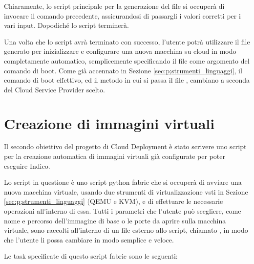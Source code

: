             Chiaramente, lo script principale per la generazione del file  si occuperà di invocare il comando precedente, assicurandosi di passargli i valori corretti per i vari input. Dopodiché lo script terminerà.
            
            Una volta che lo script avrà terminato con successo, l'utente potrà utilizzare il file  generato per inizializzare e configurare una nuova macchina su cloud in modo completamente automatico, semplicemente specificando il file  come argomento del comando di boot. Come già accennato in Sezione \ref{sec:p;strumenti_linguaggi}, il comando di boot effettivo, ed il metodo in cui si passa il file , cambiano a seconda del Cloud Service Provider scelto.

    \section{Creazione di immagini virtuali} \label{sec:cd;creazione_immagini_virtuali}
    
        Il secondo obiettivo del progetto di Cloud Deployment è stato scrivere uno script per la creazione automatica di immagini virtuali già configurate per poter eseguire Indico.
        
        Lo script in questione è uno script python fabric che si occuperà di avviare una nuova macchina virtuale, usando due strumenti di virtualizzazione vsti in Sezione \ref{sec:p;strumenti_linguaggi} (\ac{QEMU} e \ac{KVM}), e di effettuare le necessarie operazioni all'interno di essa. Tutti i parametri che l'utente può scegliere, come nome e percorso dell'immagine di base o le porte da aprire sulla macchina virtuale, sono raccolti all'interno di un file esterno allo script, chiamato , in modo che l'utente li possa cambiare in modo semplice e veloce.
        
        Le task specificate di questo script fabric sono le seguenti:
        
